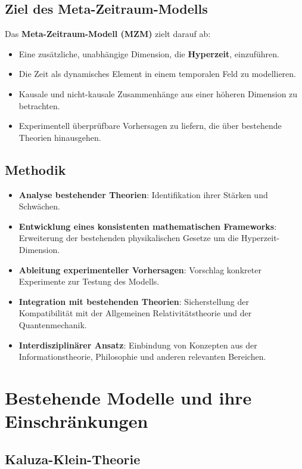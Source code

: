 \documentclass[11pt,a4paper]{article}
\begin{document}
\subsection{Ziel des Meta-Zeitraum-Modells}

Das \textbf{Meta-Zeitraum-Modell (MZM)} zielt darauf ab:

\begin{itemize}
    \item Eine zusätzliche, unabhängige Dimension, die \textbf{Hyperzeit}, einzuführen.
    \item Die Zeit als dynamisches Element in einem temporalen Feld zu modellieren.
    \item Kausale und nicht-kausale Zusammenhänge aus einer höheren Dimension zu betrachten.
    \item Experimentell überprüfbare Vorhersagen zu liefern, die über bestehende Theorien hinausgehen.
\end{itemize}

\subsection{Methodik}

\begin{itemize}
    \item \textbf{Analyse bestehender Theorien}: Identifikation ihrer Stärken und Schwächen.
    \item \textbf{Entwicklung eines konsistenten mathematischen Frameworks}: Erweiterung der bestehenden physikalischen Gesetze um die Hyperzeit-Dimension.
    \item \textbf{Ableitung experimenteller Vorhersagen}: Vorschlag konkreter Experimente zur Testung des Modells.
    \item \textbf{Integration mit bestehenden Theorien}: Sicherstellung der Kompatibilität mit der Allgemeinen Relativitätstheorie und der Quantenmechanik.
    \item \textbf{Interdisziplinärer Ansatz}: Einbindung von Konzepten aus der Informationstheorie, Philosophie und anderen relevanten Bereichen.
\end{itemize}

\section{Bestehende Modelle und ihre Einschränkungen}

\subsection{Kaluza-Klein-Theorie}
\end{document}
